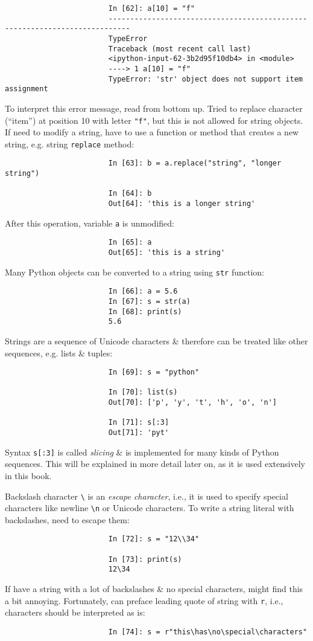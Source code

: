 \documentclass{article}
\begin{document}
\begin{enumerate}
\begin{itemize}
\begin{itemize}
\begin{itemize}
\begin{itemize}
\begin{verbatim}
						In [62]: a[10] = "f"
						---------------------------------------------------------------------------
						TypeError
						Traceback (most recent call last)
						<ipython-input-62-3b2d95f10db4> in <module>
						----> 1 a[10] = "f"
						TypeError: 'str' object does not support item assignment
					\end{verbatim}
					To interpret this error message, read from bottom up. Tried to replace character (``item'') at position 10 with letter {\tt"f"}, but this is not allowed for string objects. If need to modify a string, have to use a function or method that creates a new string, e.g. string {\tt replace} method:
					\begin{verbatim}
						In [63]: b = a.replace("string", "longer string")
						
						In [64]: b
						Out[64]: 'this is a longer string'
					\end{verbatim}
					After this operation, variable {\tt a} is unmodified:
					\begin{verbatim}
						In [65]: a
						Out[65]: 'this is a string'
					\end{verbatim}
					Many Python objects can be converted to a string using {\tt str} function:
					\begin{verbatim}
						In [66]: a = 5.6
						In [67]: s = str(a)
						In [68]: print(s)
						5.6
					\end{verbatim}
					Strings are a sequence of Unicode characters \& therefore can be treated like other sequences, e.g. lists \& tuples:
					\begin{verbatim}
						In [69]: s = "python"
						
						In [70]: list(s)
						Out[70]: ['p', 'y', 't', 'h', 'o', 'n']
						
						In [71]: s[:3]
						Out[71]: 'pyt'
					\end{verbatim}
					Syntax {\tt s[:3]} is called {\it slicing} \& is implemented for many kinds of Python sequences. This will be explained in more detail later on, as it is used extensively in this book.
					
					Backslash character \verb|\| is an {\it escape character}, i.e., it is used to specify special characters like newline \verb|\n| or Unicode characters. To write a string literal with backslashes, need to escape them:
					\begin{verbatim}
						In [72]: s = "12\\34"
						
						In [73]: print(s)
						12\34
					\end{verbatim}
					If have a string with a lot of backslashes \& no special characters, might find this a bit annoying. Fortunately, can preface leading quote of string with {\tt r}, i.e.,  characters should be interpreted as is:
					\begin{verbatim}
						In [74]: s = r"this\has\no\special\characters"
						

\end{verbatim}
\end{itemize}
\end{itemize}
\end{itemize}
\end{itemize}
\end{enumerate}
\end{document}
